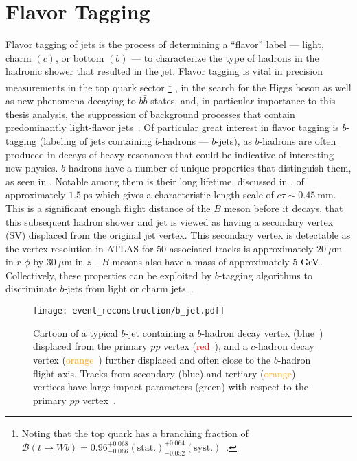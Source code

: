 \section{Flavor Tagging}\label{section:flavor_tagging}

Flavor tagging of jets is the process of determining a ``flavor'' label --- light, charm $(c)$, or bottom $(b)$ --- to characterize the type of hadrons in the hadronic shower that resulted in the jet.
Flavor tagging is vital in precision measurements in the top quark sector%
\footnote{Noting that the top quark has a branching fraction of $\mathcal{B}\left(t \to W b\right) = 0.96_{-0.066}^{+0.068}\left(\mathrm{stat.}\right)_{-0.052}^{+0.064}\left(\mathrm{syst.}\right)$~\cite{Abazov:2010tm,PhysRevD.98.030001}.}%
, in the search for the Higgs boson as well as new phenomena decaying to $b\bar{b}$ states, and, in particular importance to this thesis analysis, the suppression of background processes that contain predominantly light-flavor jets~\cite{PERF-2012-04}.
Of particular great interest in flavor tagging is $b$-tagging (labeling of jets containing $b$-hadrons --- $b$-jets), as $b$-hadrons are often produced in decays of heavy resonances that could be indicative of interesting new physics.
$b$-hadrons have a number of unique properties that distinguish them, as seen in .
Notable among them is their long lifetime, discussed in , of approximately $1.5~\mathrm{ps}$ which gives a characteristic length scale of $c\tau \sim 0.45~\mathrm{mm}$.
This is a significant enough flight distance of the $B$ meson before it decays, that this subsequent hadron shower and jet is viewed as having a secondary vertex (SV) displaced from the original jet vertex.
This secondary vertex is detectable as the vertex resolution in ATLAS for $50$ associated tracks is approximately $20~\mu\mathrm{m}$ in $r$-$\phi$ by $30~\mu\mathrm{m}$ in $z$~\cite{Choi:2271033,ATL-PHYS-PUB-2015-026}.
$B$ mesons also have a mass of approximately $5~\mathrm{GeV}$.
Collectively, these properties can be exploited by $b$-tagging algorithms to discriminate $b$-jets from light or charm jets~\cite{ATL-PHYS-PUB-2015-022,ATL-PHYS-PUB-2016-012,ATL-PHYS-PUB-2017-013,PERF-2016-05}.

\begin{figure}[htbp]
 \centering
 \centering
 \texttt{[image: event\_reconstruction/b\_jet.pdf]}
 \caption[Cartoon of a typical $b$-jet.]{%
  Cartoon of a typical $b$-jet containing a $b$-hadron decay vertex (\textcolor{track_blue}{blue}~) displaced from the primary $pp$ vertex (\textcolor{red}{red}~), and a $c$-hadron decay vertex (\textcolor{orange}{orange}~) further displaced and often close to the $b$-hadron flight axis.
  Tracks from secondary (\textcolor{track_blue}{blue}) and tertiary (\textcolor{orange}{orange}) vertices have large impact parameters (\textcolor{IPgreen}{green}) with respect to the primary $pp$ vertex~\cite{Chisholm:bjet}.}
 \label{fig:b_jet}
\end{figure}

